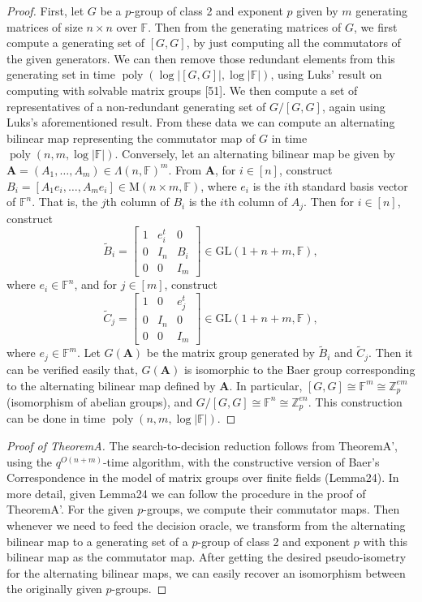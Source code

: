 \documentclass[10pt,a4paper]{article}
\begin{document}
\begin{proof}
First, let $G$ be a $p$-group of class 2 and exponent $p$ given by $m$ generating matrices of size $n\times n$ over $\mathbb F$. Then from the generating matrices of $G$, we first compute a generating set of $[G,G]$, by just computing all the commutators of the given generators. We can then remove those redundant elements from this generating set in time $\operatorname{poly}(\log|[G,G]|,\log|\mathbb F|)$, using Luks' result on computing with solvable matrix groups [51]. We then compute a set of representatives of a non-redundant generating set of $G/[G,G]$, again using Luks's aforementioned result. From these data we can compute an alternating bilinear map representing the commutator map of $G$ in time $\operatorname{poly}(n,m,\log|\mathbb F|)$.
Conversely, let an alternating bilinear map be given by $\mathbf A=(A_1,\ldots,A_m)\in\Lambda(n,\mathbb F)^m$. From $\mathbf A$, for $i\in[n]$, construct $B_i=[A_1e_i,\ldots,A_me_i]\in\mathrm M(n\times m,\mathbb F)$, where $e_i$ is the $i$th standard basis vector of $\mathbb F^n$. That is, the $j$th column of $B_i$ is the $i$th column of $A_j$. Then for $i\in[n]$, construct
\[\widetilde B_i=\begin{bmatrix}1&e_i^t&0\\0&I_n&B_i\\0&0&I_m\end{bmatrix}\in\mathrm{GL}(1+n+m,\mathbb F),\]
where $e_i\in\mathbb F^n$, and for $j\in[m]$, construct
\[\widetilde C_j=\begin{bmatrix}1&0&e_j^t\\0&I_n&0\\0&0&I_m\end{bmatrix}\in\mathrm{GL}(1+n+m,\mathbb F),\]
where $e_j\in\mathbb F^m$. Let $G(\mathbf A)$ be the matrix group generated by $\widetilde B_i$ and $\widetilde C_j$. Then it can be verified easily that, $G(\mathbf A)$ is isomorphic to the Baer group corresponding to the alternating bilinear map defined by $\mathbf A$. In particular, $[G,G]\cong\mathbb F^m\cong\mathbb Z_p^{em}$ (isomorphism of abelian groups), and $G/[G,G]\cong\mathbb F^n\cong\mathbb Z_p^{en}$. This construction can be done in time $\operatorname{poly}(n,m,\log|\mathbb F|)$.
\end{proof}

\begin{proof}[Proof of TheoremA]
The search-to-decision reduction follows from TheoremA', using the $q^{O(n+m)}$-time algorithm, with the constructive version of Baer's Correspondence in the model of matrix groups over finite fields (Lemma24).
In more detail, given Lemma24 we can follow the procedure in the proof of TheoremA'. For the given $p$-groups, we compute their commutator maps. Then whenever we need to feed the decision oracle, we transform from the alternating bilinear map to a generating set of a $p$-group of class 2 and exponent $p$ with this bilinear map as the commutator map. After getting the desired pseudo-isometry for the alternating bilinear maps, we can easily recover an isomorphism between the originally given $p$-groups.
\end{proof}
\end{document}
